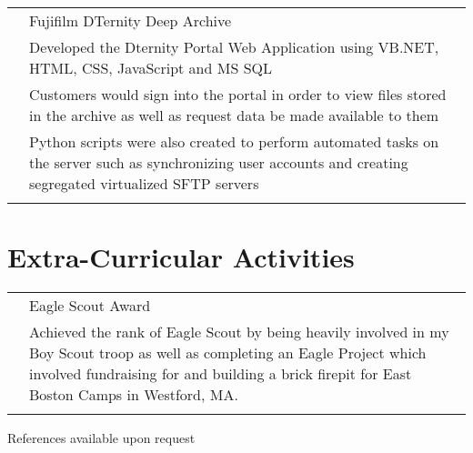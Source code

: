 \documentclass[12pt]{article}
\begin{document}
\begin{tabular}{p{2.7cm}|p{15.0cm}}
	\centering 2015 & Fujifilm DTernity Deep Archive\\&\small{Developed the Dternity Portal Web Application using VB.NET, HTML, CSS, JavaScript and MS SQL}\\&\small{Customers would sign into the portal in order to view files stored in the archive as well as request data be made available to them}\\&\small{Python scripts were also created to perform automated tasks on the server such as synchronizing user accounts and creating segregated virtualized SFTP servers}\\\multicolumn{2}{c}{} \\
\end{tabular}

\section*{\selectfont Extra-Curricular Activities}
\begin{tabular}{p{2.7cm}|p{15.0cm}}
	& Eagle Scout Award\\&\small{Achieved the rank of Eagle Scout by being heavily involved in my Boy Scout troop as well as completing an Eagle Project which involved fundraising for and building a brick firepit for East Boston Camps in Westford, MA.}\\\multicolumn{2}{c}{} \\
\end{tabular}

\vspace{0.8cm}
\centering References available upon request
\end{document}
